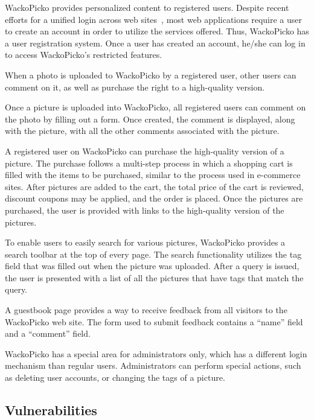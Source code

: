 WackoPicko provides personalized content to registered users.
Despite recent efforts for a unified
login across web sites~\cite{openid}, most web applications require a
user to create an account in order to utilize the 
services offered. Thus, WackoPicko has a user registration
system. Once a user has created an account, he/she can log in to
access WackoPicko's restricted features. 

When a photo is uploaded to
WackoPicko by a registered user, other users can comment on it, as well as purchase
the right to a high-quality version.

Once a picture is uploaded into WackoPicko, all registered users can
comment on the photo by filling out a form.
Once created, the comment is displayed, along with the picture,
with all the other comments associated with the picture.

A registered user on WackoPicko can purchase the high-quality version
of a picture. The purchase follows a multi-step process in which a shopping cart
is filled with the items to be purchased,  similar to the process used
in e-commerce
sites. After pictures are added to the cart, the
total price of the cart is reviewed, discount coupons may be applied, and the
order is placed. Once the pictures are purchased, the user 
is provided with links to the high-quality version of the pictures.

To enable users to easily search for various pictures,
WackoPicko provides a search toolbar at the top of every
page. The search functionality utilizes the tag field that was filled out when
the picture was uploaded. After a query is issued, the user is
presented with a list of all the pictures that have tags that
match the query. 

A guestbook page provides a way to receive feedback from all visitors
to the WackoPicko web site. The form used to submit feedback contains a ``name'' field and
a ``comment'' field. 

WackoPicko has a special area for administrators only, which has a
different login mechanism than regular users. 
Administrators can perform special actions, such as
deleting user accounts, or changing the tags of a picture.

\subsection{Vulnerabilities}

